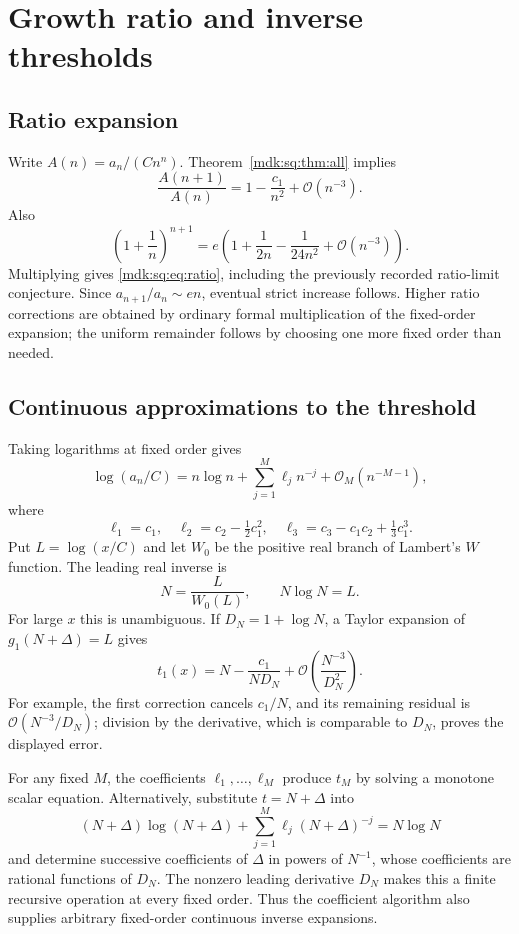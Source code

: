 \documentclass[11pt,letterpaper]{article}
\numberwithin{equation}{section}
\theoremstyle{remark}\newtheorem{remark}[theorem]{Remark}
\newcommand{\Oh}{\mathcal O}\newcommand{\Q}{\mathbb Q}\newcommand{\N}{\mathbb N}\newcommand{\R}{\mathbb R}
\begin{document}
\section{Growth ratio and inverse thresholds}\label{mdk:sq:sec:inverse}
\subsection{Ratio expansion}
Write $A(n)=a_n/(Cn^n)$. Theorem~\ref{mdk:sq:thm:all} implies
\[
\frac{A(n+1)}{A(n)}=1-\frac{c_1}{n^2}+\Oh(n^{-3}).
\]
Also
\[
\left(1+\frac1n\right)^{n+1}
=e\left(1+\frac1{2n}-\frac1{24n^2}+\Oh(n^{-3})\right).
\]
Multiplying gives \eqref{mdk:sq:eq:ratio}, including the previously recorded ratio-limit conjecture. Since $a_{n+1}/a_n\sim en$, eventual strict increase follows. Higher ratio corrections are obtained by ordinary formal multiplication of the fixed-order expansion; the uniform remainder follows by choosing one more fixed order than needed.

\subsection{Continuous approximations to the threshold}
Taking logarithms at fixed order gives
\begin{equation}\label{mdk:sq:eq:log-error}
\log(a_n/C)=n\log n+\sum_{j=1}^M\ell_jn^{-j}
+\Oh_M(n^{-M-1}),
\end{equation}
where
\[
\ell_1=c_1,\quad\ell_2=c_2-\tfrac12c_1^2,\quad
\ell_3=c_3-c_1c_2+\tfrac13c_1^3.
\]
Put $L=\log(x/C)$ and let $W_0$ be the positive real branch of Lambert's $W$ function. The leading real inverse is
\begin{equation}\label{mdk:sq:eq:Lambert}
N=\frac{L}{W_0(L)},\qquad N\log N=L.
\end{equation}
For large $x$ this is unambiguous. If $D_N=1+\log N$, a Taylor expansion of $g_1(N+\Delta)=L$ gives
\begin{equation}\label{mdk:sq:eq:first-inverse}
t_1(x)=N-\frac{c_1}{ND_N}
+\Oh\left(\frac{N^{-3}}{D_N^2}\right).
\end{equation}
For example, the first correction cancels $c_1/N$, and its remaining residual is $\Oh(N^{-3}/D_N)$; division by the derivative, which is comparable to $D_N$, proves the displayed error.

For any fixed $M$, the coefficients $\ell_1,\ldots,\ell_M$ produce $t_M$ by solving a monotone scalar equation. Alternatively, substitute $t=N+\Delta$ into
\[
(N+\Delta)\log(N+\Delta)
+\sum_{j=1}^M\ell_j(N+\Delta)^{-j}=N\log N
\]
and determine successive coefficients of $\Delta$ in powers of $N^{-1}$, whose coefficients are rational functions of $D_N$. The nonzero leading derivative $D_N$ makes this a finite recursive operation at every fixed order. Thus the coefficient algorithm also supplies arbitrary fixed-order continuous inverse expansions.
\end{document}
